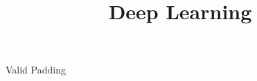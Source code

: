 




\newcommand{\titlefigure}{figure/stride4.png}
\newcommand{\learninggoals}{
  \item Padding
  \item Stride
  \item Pooling
  \item Input Channel
}

\title{Deep Learning}
\date{}







\begin{frame}{Valid Padding}


\end{frame}
